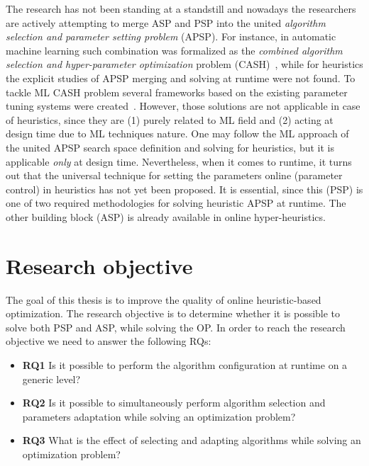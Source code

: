 The research has not been standing at a standstill and nowadays the researchers are actively attempting to merge ASP and PSP into the united \emph{algorithm selection and parameter setting problem} (APSP). For instance, in automatic machine learning such combination was formalized as the \emph{combined algorithm selection and hyper-parameter optimization} problem (CASH)~\cite{thornton2013auto}, while for heuristics the explicit studies of APSP merging and solving at runtime were not found. To tackle ML CASH problem several frameworks based on the existing parameter tuning systems were created~\cite{thornton2013auto,feurer2015efficient,olson2019tpot}. However, those solutions are not applicable in case of heuristics, since they are (1) purely related to ML field and (2) acting at design time due to ML techniques nature. One may follow the ML approach of the united APSP search space definition and solving for heuristics, but it is applicable \emph{only} at design time. Nevertheless, when it comes to runtime, it turns out that the universal technique for setting the parameters online (parameter control) in heuristics has not yet been proposed. It is essential, since this (PSP) is one of two required methodologies for solving heuristic APSP at runtime. The other building block (ASP) is already available in online hyper-heuristics.

\section{Research objective}\label{intro: research objective}
The goal of this thesis is to improve the quality of online heuristic-based optimization. The research objective is to determine whether it is possible to solve both PSP and ASP, while solving the OP. In order to reach the research objective we need to answer the following RQs:
\begin{itemize}
	\item \textbf{RQ1} Is it possible to perform the algorithm configuration at runtime on a generic level?
	
	\item \textbf{RQ2} Is it possible to simultaneously perform algorithm selection and parameters adaptation while solving an optimization problem?
	
	\item \textbf{RQ3} What is the effect of selecting and adapting algorithms while solving an optimization problem?
\end{itemize}


